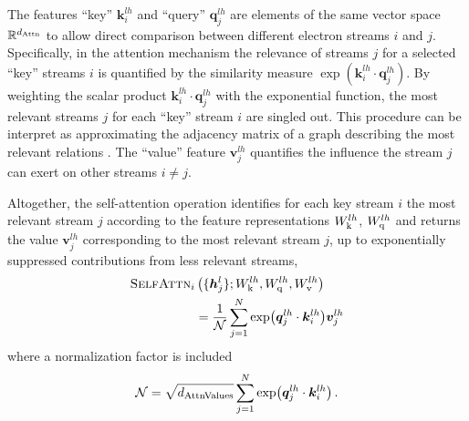 \documentclass[
 reprint,
 amsmath,amssymb,
 aps, prx,
floatfix,longbibliography,
]{revtex4-2}
\begin{document}
The features ``key'' $\bm k_i^{lh}$ and ``query'' $\bm q_j^{lh}$ are elements of the same vector space $\mathbb{R}^{d_{\rm Attn}}$ to allow direct comparison between different electron streams $i$ and $j$.  
Specifically, in the attention mechanism the relevance of streams $j$ for a selected ``key'' streams $i$ is quantified by the similarity measure $\exp (\bm k_i^{lh} \cdot \bm q_j^{lh})$. 
By weighting the scalar product $\bm k_i^{lh} \cdot \bm q_j^{lh}$ with the exponential function, the most relevant streams $j$ for each ``key'' stream $i$ are singled out.
This procedure can be interpret as approximating the adjacency matrix of a graph describing the most relevant relations \cite{Buehler2025Jan}. 
The ``value'' feature $\bm v_j^{lh}$ quantifies the influence the stream $j$ can exert on other streams $i \neq j$. 


Altogether, the self-attention operation identifies for each key stream $i$ the most relevant stream $j$ according to the feature representations $W_{\rm k}^{lh}$, $W_{\rm q}^{lh}$ and returns the value $\bm v_j^{lh}$ corresponding to the most relevant stream $j$, up to exponentially suppressed contributions from less relevant streams, 
\begin{align}
    {\rm \textsc{SelfAttn}}_i &  \left(\{ \bm h_j^l\}; W_{\rm k}^{lh}, W_{\rm q}^{lh}, W_{\rm v}^{lh}\right) \nonumber \\
     & = \frac{1}{\cal N} \sum_{j = 1}^N \exp({\bm q_j^{lh} \cdot \bm k_i^{lh}}) \bm v_j^{lh} 
     \label{eq:NN-attn-def-selfattn}
\end{align}
where a normalization factor is included
\begin{equation*}
    {\cal N} = \sqrt{d_{\rm AttnValues}} \sum_{j = 1}^N \exp({\bm q_j^{lh} \cdot \bm k_i^{lh}})\,.
\end{equation*}
\end{document}
